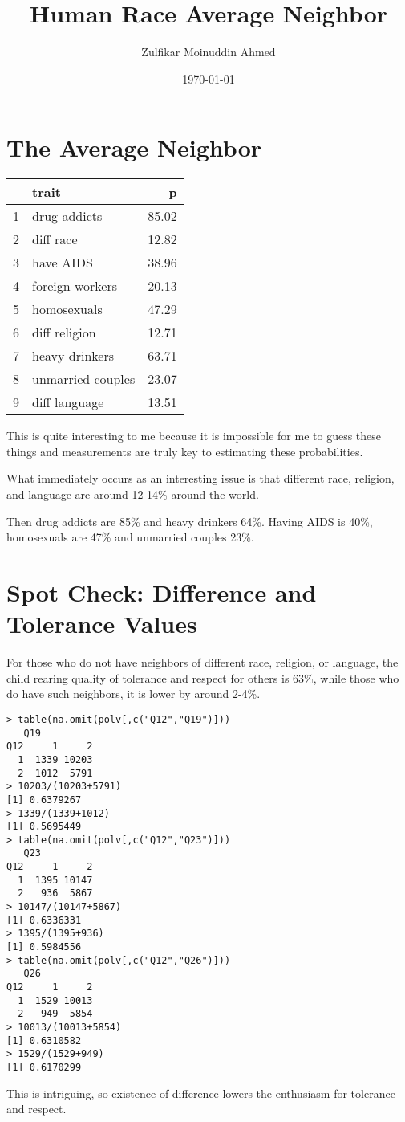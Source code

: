 \documentclass{amsart}
\title{Human Race Average Neighbor}
\author{Zulfikar Moinuddin Ahmed}
\date{\today}
\begin{document}
\maketitle


\section{The Average Neighbor}

\begin{table}[ht]
\centering
\begin{tabular}{rlr}
  \hline
 & trait & p \\ 
  \hline
1 & drug addicts & 85.02 \\ 
  2 & diff race & 12.82 \\ 
  3 & have AIDS & 38.96 \\ 
  4 & foreign workers & 20.13 \\ 
  5 & homosexuals & 47.29 \\ 
  6 & diff religion & 12.71 \\ 
  7 & heavy drinkers & 63.71 \\ 
  8 & unmarried couples & 23.07 \\ 
  9 & diff language & 13.51 \\ 
   \hline
\end{tabular}
\end{table}

This is quite interesting to me because it is impossible for me to guess these things and measurements are truly key to estimating these probabilities.  

What immediately occurs as an interesting issue is that different race, religion, and language are around 12-14\% around the world.

Then drug addicts are 85\% and heavy drinkers 64\%.  Having AIDS is 40\%, homosexuals are 47\% and unmarried couples 23\%.

\section{Spot Check:  Difference and Tolerance Values}

For those who do not have neighbors of different race, religion, or language, the child rearing quality of tolerance and respect for others is 63\%, while those who do have such neighbors, it is lower by around 2-4\%.

\begin{verbatim}
> table(na.omit(polv[,c("Q12","Q19")]))
   Q19
Q12     1     2
  1  1339 10203
  2  1012  5791
> 10203/(10203+5791)
[1] 0.6379267
> 1339/(1339+1012)
[1] 0.5695449
> table(na.omit(polv[,c("Q12","Q23")]))
   Q23
Q12     1     2
  1  1395 10147
  2   936  5867
> 10147/(10147+5867)
[1] 0.6336331
> 1395/(1395+936)
[1] 0.5984556
> table(na.omit(polv[,c("Q12","Q26")]))
   Q26
Q12     1     2
  1  1529 10013
  2   949  5854
> 10013/(10013+5854)
[1] 0.6310582
> 1529/(1529+949)
[1] 0.6170299
\end{verbatim} 
This is intriguing, so existence of difference lowers the enthusiasm for tolerance and respect.
\end{document}

